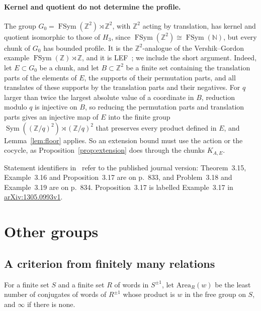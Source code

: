 \documentclass[11pt,a4paper]{article}
\theoremstyle{plain}
\theoremstyle{definition}
\theoremstyle{remark}
\DeclareMathOperator{\Sym}{Sym}
\DeclareMathOperator{\FSym}{FSym}
\begin{document}
\paragraph{Kernel and quotient do not determine the profile.} The group $G_0=\FSym(\mathbb Z^2)\rtimes\mathbb Z^2$, with $\mathbb Z^2$ acting by
translation, has kernel and quotient isomorphic to those of $H_3$, since $\FSym(\mathbb Z^2)\cong\FSym(\mathbb N)$, but every chunk of $G_0$ has
bounded profile. It is the $\mathbb Z^2$-analogue of the Vershik--Gordon example $\FSym(\mathbb Z)\rtimes\mathbb Z$, and it is
LEF~\cite{VershikGordon1997,Bradford2022,AlekseevBradford2026}; we include the short argument. Indeed, let $E\subset G_0$ be a chunk, and let $B\subset\mathbb Z^2$ be a finite set containing the translation parts of the
elements of $E$, the supports of their permutation parts, and all translates of these supports by the translation parts and their negatives.
For $q$ larger than twice the largest absolute value of a coordinate in $B$, reduction modulo $q$ is injective on $B$, so reducing the
permutation parts and translation parts gives an injective map of $E$ into the finite group $\Sym((\mathbb Z/q)^2)\rtimes(\mathbb Z/q)^2$ that
preserves every product defined in $E$, and Lemma~\ref{lem:floor} applies. So an extension bound must use the action or the cocycle, as
Proposition~\ref{prop:extension} does through the chunks $K_{A,E}$.

Statement identifiers in~\cite{Cornulier2013} refer to the published journal version:
Theorem~3.15, Example~3.16 and Proposition~3.17 are on p.~833, and Problem~3.18 and Example~3.19 are on p.~834.
Proposition~3.17 is labelled Example~3.17 in \href{https://arxiv.org/abs/1305.0993v1}{arXiv:1305.0993v1}.

\section{Other groups}\label{sec:other}

\subsection{A criterion from finitely many relations}\label{sec:certificate}

For a finite set $S$ and a finite set $R$ of words in $S^{\pm1}$, let $\mathrm{Area}_R(w)$ be the least number of conjugates of words of
$R^{\pm1}$ whose product is $w$ in the free group on $S$, and $\infty$ if there is none.
\end{document}
